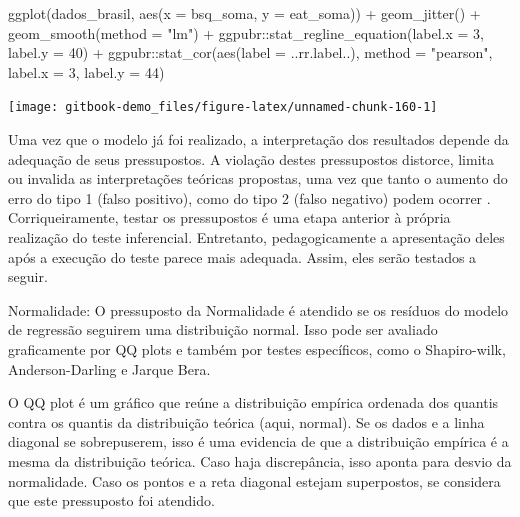 \documentclass[
]{book}
\newenvironment{Shaded}{\begin{snugshade}}{\end{snugshade}}
\newcommand{\AttributeTok}[1]{\textcolor[rgb]{0.77,0.63,0.00}{#1}}
\newcommand{\DecValTok}[1]{\textcolor[rgb]{0.00,0.00,0.81}{#1}}
\newcommand{\FunctionTok}[1]{\textcolor[rgb]{0.00,0.00,0.00}{#1}}
\newcommand{\NormalTok}[1]{#1}
\newcommand{\SpecialCharTok}[1]{\textcolor[rgb]{0.00,0.00,0.00}{#1}}
\newcommand{\StringTok}[1]{\textcolor[rgb]{0.31,0.60,0.02}{#1}}
\begin{document}
\begin{Shaded}
\begin{Highlighting}[]
\FunctionTok{ggplot}\NormalTok{(dados\_brasil, }\FunctionTok{aes}\NormalTok{(}\AttributeTok{x =}\NormalTok{ bsq\_soma, }\AttributeTok{y =}\NormalTok{ eat\_soma)) }\SpecialCharTok{+}
  \FunctionTok{geom\_jitter}\NormalTok{() }\SpecialCharTok{+} \FunctionTok{geom\_smooth}\NormalTok{(}\AttributeTok{method =} \StringTok{"lm"}\NormalTok{) }\SpecialCharTok{+} 
\NormalTok{  ggpubr}\SpecialCharTok{::}\FunctionTok{stat\_regline\_equation}\NormalTok{(}\AttributeTok{label.x =} \DecValTok{3}\NormalTok{, }\AttributeTok{label.y =} \DecValTok{40}\NormalTok{) }\SpecialCharTok{+}
\NormalTok{  ggpubr}\SpecialCharTok{::}\FunctionTok{stat\_cor}\NormalTok{(}\FunctionTok{aes}\NormalTok{(}\AttributeTok{label =}\NormalTok{  ..rr.label..), }\AttributeTok{method =} \StringTok{"pearson"}\NormalTok{, }
                   \AttributeTok{label.x =} \DecValTok{3}\NormalTok{, }\AttributeTok{label.y =} \DecValTok{44}\NormalTok{)}
\end{Highlighting}
\end{Shaded}

\begin{center}\texttt{[image: gitbook-demo\_files/figure-latex/unnamed-chunk-160-1]} \end{center}

Uma vez que o modelo já foi realizado, a interpretação dos resultados depende da adequação de seus pressupostos. A violação destes pressupostos distorce, limita ou invalida as interpretações teóricas propostas, uma vez que tanto o aumento do erro do tipo 1 (falso positivo), como do tipo 2 (falso negativo) podem ocorrer \citep{Lix1996, Barker2015, Ernst2017}. Corriqueiramente, testar os pressupostos é uma etapa anterior à própria realização do teste inferencial. Entretanto, pedagogicamente a apresentação deles após a execução do teste parece mais adequada. Assim, eles serão testados a seguir.

Normalidade: O pressuposto da Normalidade é atendido se os resíduos do modelo de regressão seguirem uma distribuição normal. Isso pode ser avaliado graficamente por QQ plots e também por testes específicos, como o Shapiro-wilk, Anderson-Darling e Jarque Bera.

O QQ plot é um gráfico que reúne a distribuição empírica ordenada dos quantis contra os quantis da distribuição teórica (aqui, normal). Se os dados e a linha diagonal se sobrepuserem, isso é uma evidencia de que a distribuição empírica é a mesma da distribuição teórica. Caso haja discrepância, isso aponta para desvio da normalidade. Caso os pontos e a reta diagonal estejam superpostos, se considera que este pressuposto foi atendido.
\end{document}

